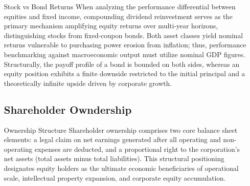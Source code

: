 \documentclass[10pt]{article}
\begin{document}
    \begin{core}{Stock vs Bond Returns}
      When analyzing the performance differential between equities and fixed income, compounding dividend reinvestment serves as the primary mechanism amplifying equity returns over multi-year horizons, distinguishing stocks from fixed-coupon bonds. Both asset classes yield nominal returns vulnerable to purchasing power erosion from inflation; thus, performance benchmarking against macroeconomic output must utilize nominal GDP figures. Structurally, the payoff profile of a bond is bounded on both sides, whereas an equity position exhibits a finite downside restricted to the initial principal and a theoretically infinite upside driven by corporate growth.
    \end{core}

  \subsection{Shareholder Owndership}

    \begin{core}{Ownership Structure}
      Shareholder ownership comprises two core balance sheet elements: a legal claim on net earnings generated after all operating and non-operating expenses are deducted, and a proportional right to the corporation's net assets (total assets minus total liabilities). This structural positioning designates equity holders as the ultimate economic beneficiaries of operational scale, intellectual property expansion, and corporate equity accumulation.
    \end{core}
\end{document}
